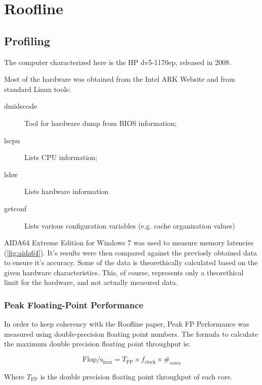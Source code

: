 \section{Roofline}

\subsection{Profiling}
The computer characterized here is the HP dv5-1170ep, released in 2008.

Most of the hardware was obtained from the Intel ARK Website \cite{ark} and from standard Linux tools:
\begin{description}
\item[dmidecode] Tool for hardware dump from BIOS information;
\item[lscpu] Lists CPU information;
\item[lshw] Lists hardware information
\item[getconf] Lists various configuration variables (e.g. cache organization values)
\end{description}

AIDA64 Extreme Edition for Windows 7 was used to measure memory latencies (\autoref{fig:aida64}). It's results were then compared against the previosly obtained data to ensure it's accuracy.
Some of the data is theorethically calculated based on the given hardware characteristics. This, of course, represents only a theorethical limit for the hardware, and not actually measured data.

\subsubsection{Peak Floating-Point Performance}
In order to keep coherency with the Roofline paper\cite{roofline}, Peak FP Performance was measured using double-precision floating point numbers. The formula to calculate the maximum double precision floating point throughput is:

$$\mathrm{Flop/s_{max}} = T_{\mathrm{FP}} \times f_{\mathrm{clock}} \times \#_{\mathrm{cores}}$$

Where $T_{\mathrm{FP}}$ is the double precision floating point throughput of each core.

